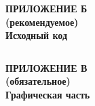 \newpage




\begin{center}
\textbf{
\MakeUppercase{Приложение Б}\\
(рекомендуемое)\\
Исходный код}
\end{center}
\setcounter{page}{36}

\inputminted{swift}{inc/src/lol.swift}

\newpage

\begin{center}
\textbf{
\MakeUppercase{Приложение В}\\
(обязательное)\\
Графическая часть}
\end{center}
